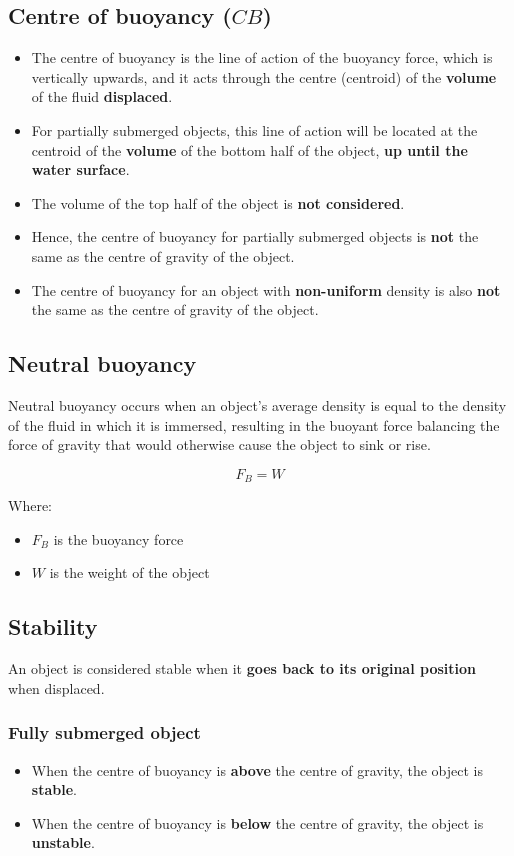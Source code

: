 \documentclass[11pt]{article}
\begin{document}
\subsection{Centre of buoyancy (\(CB\))}
\label{sec:org48c0228}
\begin{itemize}
\item The centre of buoyancy is the line of action of the buoyancy force, which is vertically upwards, and it acts through the centre (centroid) of the \textbf{volume} of the fluid \textbf{displaced}.
\item For partially submerged objects, this line of action will be located at the centroid of the \textbf{volume} of the bottom half of the object, \textbf{up until the water surface}.
\item The volume of the top half of the object is \textbf{not considered}.
\item Hence, the centre of buoyancy for partially submerged objects is \textbf{not} the same as the centre of gravity of the object.
\item The centre of buoyancy for an object with \textbf{non-uniform} density is also \textbf{not} the same as the centre of gravity of the object.
\end{itemize}

\subsection{Neutral buoyancy}
\label{sec:org4358a89}
Neutral buoyancy occurs when an object's average density is equal to the density of the fluid in which it is immersed, resulting in the buoyant force balancing the force of gravity that would otherwise cause the object to sink or rise.

\[F_B = W\]

Where:
\begin{itemize}
\item \(F_B\) is the buoyancy force
\item \(W\) is the weight of the object
\end{itemize}

\subsection{Stability}
\label{sec:orgc2306ad}
An object is considered stable when it \textbf{goes back to its original position} when displaced.

\subsubsection{Fully submerged object}
\label{sec:org2c3eaab}
\begin{itemize}
\item When the centre of buoyancy is \textbf{above} the centre of gravity, the object is \textbf{stable}.
\item When the centre of buoyancy is \textbf{below} the centre of gravity, the object is \textbf{unstable}.
\end{itemize}
\end{document}
